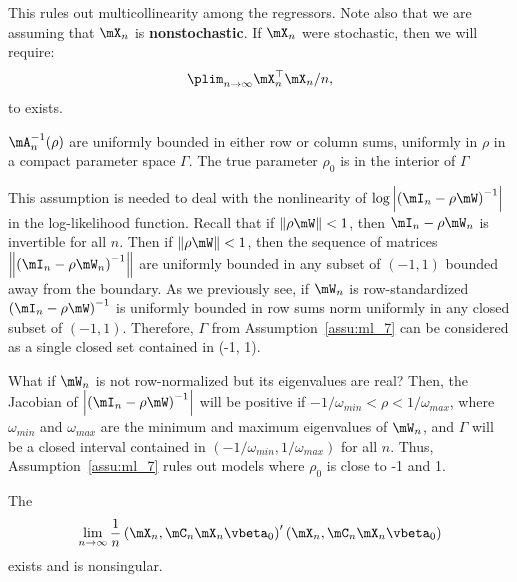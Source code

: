 \documentclass[english,12pt]{book}\usepackage[]{graphicx}\usepackage[]{xcolor}
\begin{document}
This rules out multicollinearity among the regressors. Note also that we are assuming that $\mX_n$ is \textbf{nonstochastic}. If $\mX_n$ were stochastic, then we will require:
\begin{equation*}
  \plim_{n\to \infty}\mX_n^\top\mX_n/ n,
\end{equation*}
%
to exists.


\begin{assumption}\label{assu:ml_7}
	${\mA_n^{-1}(\rho)}$ are uniformly bounded in either row or column sums, uniformly in $\rho$ in a compact parameter space $\Gamma$. The true parameter $\rho_0$ is in the interior of $\Gamma$
\end{assumption}

This assumption is needed to deal with the nonlinearity of $\log \left|\left(\mI_n - \rho \mW\right)^{-1}\right|$ in the log-likelihood function. Recall that if $\left\| \rho\mW\right\| < 1$, then $\mI_n - \rho\mW_n$ is invertible for all $n$. Then if $\left\| \rho\mW\right\| < 1$, then the sequence of matrices $\left\|\left(\mI_n- \rho\mW_n\right)^{-1}\right\|$ are uniformly bounded in any subset of $(-1, 1)$ bounded away from the boundary. As we previously see, if $\mW_n$ is row-standardized $\left(\mI_n- \rho\mW\right)^{-1}$ is uniformly bounded in row sums norm uniformly in any closed subset of $(-1, 1)$. Therefore, $\Gamma$ from Assumption~\ref{assu:ml_7} can be considered as a single closed set contained in (-1, 1).

What if $\mW_n$ is not row-normalized but its eigenvalues are real? Then, the Jacobian of $\left|\left(\mI_n- \rho\mW\right)^{-1}\right|$ will be positive if $-1/\omega_{min} < \rho < 1/\omega_{max}$, where $\omega_{min}$ and $\omega_{max}$ are the minimum and maximum eigenvalues of $\mW_n$, and $\Gamma$ will be a closed interval contained in $(-1/\omega_{min}, 1/\omega_{max})$ for all $n$. Thus, Assumption~\ref{assu:ml_7} rules out models where $\rho_0$ is close to -1 and 1.  

\begin{assumption}\label{assu:ml_8}
		The
		\begin{equation*}
			\lim_{n\to \infty}\frac{1}{n}\left(\mX_n, \mC_n\mX_n\vbeta_0\right)'\left(\mX_n, \mC_n\mX_n\vbeta_0\right)
		\end{equation*}
		 exists and is nonsingular.
\end{assumption}
\end{document}
